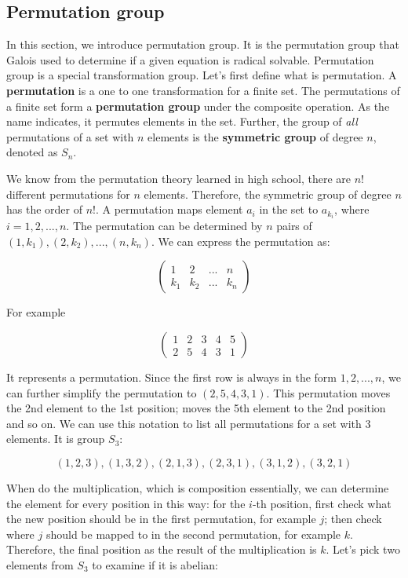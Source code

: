 \documentclass{article}
\begin{document}
\subsection{Permutation group}
\label{permutation group}
\label{symmetric group}

In this section, we introduce permutation group. It is the permutation group that Galois used to determine if a given equation is radical solvable. Permutation group is a special transformation group. Let's first define what is permutation. A \textbf{permutation} is a one to one transformation for a finite set. The permutations of a finite set form a \textbf{permutation group} under the composite operation. As the name indicates, it permutes elements in the set. Further, the group of {\em all} permutations of a set with $n$ elements is the \textbf{symmetric group} of degree $n$, denoted as $S_n$.

We know from the permutation theory learned in high school, there are $n!$ different permutations for $n$ elements. Therefore, the symmetric group of degree $n$ has the order of $n!$. A permutation maps element $a_i$ in the set to $a_{k_i}$, where $i = 1, 2, ..., n$. The permutation can be determined by $n$ pairs of $(1, k_1), (2, k_2), ..., (n, k_n)$. We can express the permutation as:

\[
\begin{pmatrix}
1 & 2 & ... & n \\
k_1 & k_2 & ... & k_n
\end{pmatrix}
\]

For example

\[
\begin{pmatrix}
1 & 2 & 3 & 4 & 5 \\
2 & 5 & 4 & 3 & 1
\end{pmatrix}
\]

It represents a permutation. Since the first row is always in the form $1, 2, ..., n$, we can further simplify the permutation to $(2, 5, 4, 3, 1)$. This permutation moves the 2nd element to the 1st position; moves the 5th element to the 2nd position and so on. We can use this notation to list all permutations for a set with 3 elements. It is group $S_3$:

\[
(1, 2, 3), (1, 3, 2), (2, 1, 3), (2, 3, 1), (3, 1, 2), (3, 2, 1)
\]

When do the multiplication, which is composition essentially, we can determine the element for every position in this way: for the $i$-th position, first check what the new position should be in the first permutation, for example $j$; then check where $j$ should be mapped to in the second permutation, for example $k$. Therefore, the final position as the result of the multiplication is $k$. Let's pick two elements from $S_3$ to examine if it is abelian:
\end{document}
